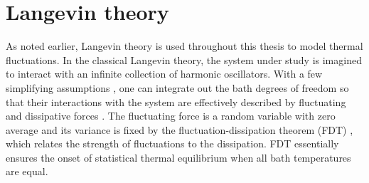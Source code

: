 







\section{Langevin theory}
\label{sec:th_langevin}

As noted earlier, Langevin theory is used throughout this thesis to model thermal fluctuations. In the classical Langevin theory, the system under study is imagined to interact with an infinite collection of harmonic oscillators. With a few simplifying assumptions \cite{weiss}, one can integrate out the bath degrees of freedom so that their interactions with the system are effectively described by fluctuating and dissipative forces \cite{weiss,dhar06}. The fluctuating force is a random variable with zero average and its variance is fixed by the fluctuation-dissipation theorem (FDT) \cite{nyquist28,callen51}, which relates the strength of fluctuations to the dissipation. FDT essentially ensures the onset of statistical thermal equilibrium when all bath temperatures are equal.


